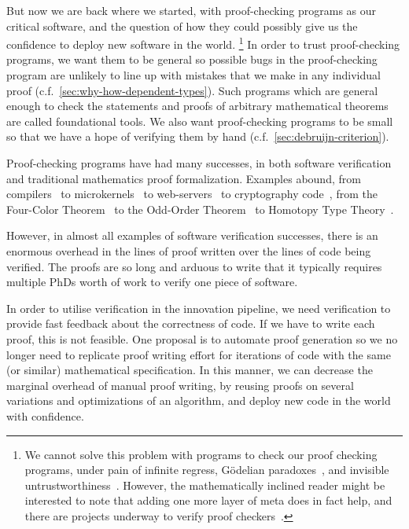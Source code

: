 But now we are back where we started, with proof-checking programs as our critical software, and the question of how they could possibly give us the confidence to deploy new software in the world.%
\footnote{%
  We cannot solve this problem with programs to check our proof checking programs, under pain of infinite regress, Gödelian paradoxes~\cite{sep-goedel-incompleteness}, and invisible untrustworthiness~\cite{Reflections1984Thompson}.
  However, the mathematically inclined reader might be interested to note that adding one more layer of meta does in fact help, and there are projects underway to verify proof checkers~\cite{nuprl-in-coq,coq-coq-correct,certicoq}.
}
In order to trust proof-checking programs, we want them to be general so possible bugs in the proof-checking program are unlikely to line up with mistakes that we make in any individual proof (c.f.~\autoref{sec:why-how-dependent-types}).
Such programs which are general enough to check the statements and proofs of arbitrary mathematical theorems are called foundational tools.
We also want proof-checking programs to be small so that we have a hope of verifying them by hand (c.f.~\autoref{sec:debruijn-criterion}).


Proof-checking programs have had many successes, in both software verification and traditional mathematics proof formalization.
Examples abound, from compilers~\cite{Compcert} to microkernels~\cite{seL4SOSP09} to web-servers~\cite{Network2015Chlipala} to cryptography code~\cite{FiatCryptoSP19}, from the Four-Color Theorem~\cite{gonthier2008formal} to the Odd-Order Theorem~\cite{gonthier2013machine} to Homotopy Type Theory~\cite{HoTTBook}.

However, in almost all examples of software verification successes, there is an enormous overhead in the lines of proof written over the lines of code being verified.
The proofs are so long and arduous to write that it typically requires multiple PhDs worth of work to verify one piece of software.
\label{sec:manual-proof-long}

In order to utilise verification in the innovation pipeline, we need verification to provide fast feedback about the correctness of code.
If we have to write each proof, this is not feasible.
One proposal is to automate proof generation so we no longer need to replicate proof writing effort for iterations of code with the same (or similar) mathematical specification.
In this manner, we can decrease the marginal overhead of manual proof writing, by reusing proofs on several variations and optimizations of an algorithm, and deploy new code in the world with confidence.

